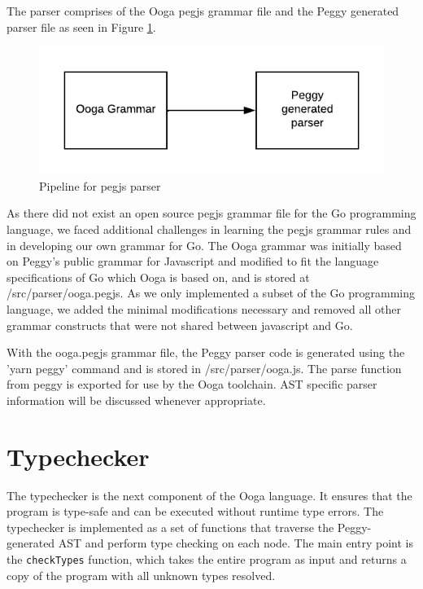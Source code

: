 \documentclass{report}
\begin{document}
The parser comprises of the Ooga pegjs grammar file and the Peggy generated parser file as seen in Figure \ref{fig:pegjs-pipeline}.

\begin{figure}
    \centering
    \includegraphics{pegjs-pipeline.png}
    \caption{Pipeline for pegjs parser}
    \label{fig:pegjs-pipeline}
\end{figure}

As there did not exist an open source pegjs grammar file for the Go programming language, we faced additional challenges in learning the pegjs grammar rules and in developing our own grammar for Go. The Ooga grammar was initially based on Peggy's public grammar for Javascript and modified to fit the language specifications of Go which Ooga is based on, and is stored at /src/parser/ooga.pegjs. As we only implemented a subset of the Go programming language, we added the minimal modifications necessary and removed all other grammar constructs that were not shared between javascript and Go.

With the ooga.pegjs grammar file, the Peggy parser code is generated using the 'yarn peggy' command and is stored in /src/parser/ooga.js. The parse function from peggy is exported for use by the Ooga toolchain. AST specific parser information will be discussed whenever appropriate.

\section{Typechecker}

The typechecker is the next component of the Ooga language. It ensures that the program is type-safe and can be executed without runtime type errors. The typechecker is implemented as a set of functions that traverse the Peggy-generated AST and perform type checking on each node. The main entry point is the \texttt{checkTypes} function, which takes the entire program as input and returns a copy of the program with all unknown types resolved.\\
\end{document}
